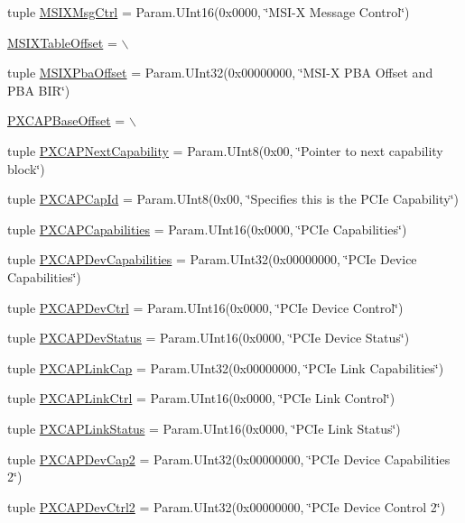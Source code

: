 \begin{DoxyCompactItemize}
\item 
tuple \hyperlink{classPci_1_1PciDevice_ad9aad2a746e4f73b81c82107c83b3c28}{MSIXMsgCtrl} = Param.UInt16(0x0000, \char`\"{}MSI-\/X Message Control\char`\"{})
\item 
\hyperlink{classPci_1_1PciDevice_a6415778fada7dfc7f0e386b9112df28e}{MSIXTableOffset} = $\backslash$
\item 
tuple \hyperlink{classPci_1_1PciDevice_a1db7de1e6c775093807199cb4a7b2236}{MSIXPbaOffset} = Param.UInt32(0x00000000, \char`\"{}MSI-\/X PBA Offset and PBA BIR\char`\"{})
\item 
\hyperlink{classPci_1_1PciDevice_ad2caae7371e91cd9f9fe16993eb175f0}{PXCAPBaseOffset} = $\backslash$
\item 
tuple \hyperlink{classPci_1_1PciDevice_a88eb1645e6dce97606bd6f1bf6decfed}{PXCAPNextCapability} = Param.UInt8(0x00, \char`\"{}Pointer to next capability block\char`\"{})
\item 
tuple \hyperlink{classPci_1_1PciDevice_a11b2b5c70013fdbd6ec8579a3c766e8a}{PXCAPCapId} = Param.UInt8(0x00, \char`\"{}Specifies this is the PCIe Capability\char`\"{})
\item 
tuple \hyperlink{classPci_1_1PciDevice_ad4b26ade9d111a52e61b337b836a79b7}{PXCAPCapabilities} = Param.UInt16(0x0000, \char`\"{}PCIe Capabilities\char`\"{})
\item 
tuple \hyperlink{classPci_1_1PciDevice_a0188e4c357bde5dda179f434da090760}{PXCAPDevCapabilities} = Param.UInt32(0x00000000, \char`\"{}PCIe Device Capabilities\char`\"{})
\item 
tuple \hyperlink{classPci_1_1PciDevice_a8c7342c52e738ee346240619a899d1b9}{PXCAPDevCtrl} = Param.UInt16(0x0000, \char`\"{}PCIe Device Control\char`\"{})
\item 
tuple \hyperlink{classPci_1_1PciDevice_af7deb8e97cf1e53524d5ef5239e8d099}{PXCAPDevStatus} = Param.UInt16(0x0000, \char`\"{}PCIe Device Status\char`\"{})
\item 
tuple \hyperlink{classPci_1_1PciDevice_a6bbe8e0a13547fa64b787a6c5661703b}{PXCAPLinkCap} = Param.UInt32(0x00000000, \char`\"{}PCIe Link Capabilities\char`\"{})
\item 
tuple \hyperlink{classPci_1_1PciDevice_a98c7ece798cf7c093c09b8437a5d9131}{PXCAPLinkCtrl} = Param.UInt16(0x0000, \char`\"{}PCIe Link Control\char`\"{})
\item 
tuple \hyperlink{classPci_1_1PciDevice_aa9f82b98ef62d06b866799ae754d891f}{PXCAPLinkStatus} = Param.UInt16(0x0000, \char`\"{}PCIe Link Status\char`\"{})
\item 
tuple \hyperlink{classPci_1_1PciDevice_a159956e2ad80c6b1983c8a24545058bd}{PXCAPDevCap2} = Param.UInt32(0x00000000, \char`\"{}PCIe Device Capabilities 2\char`\"{})
\item 
tuple \hyperlink{classPci_1_1PciDevice_a867be9885742d746cbcbde5df5fb2959}{PXCAPDevCtrl2} = Param.UInt32(0x00000000, \char`\"{}PCIe Device Control 2\char`\"{})
\end{DoxyCompactItemize}


